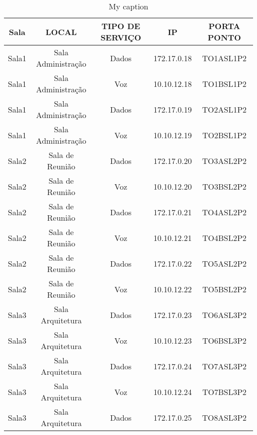 \begin{table}[]
	\centering
	\caption{My caption}
	\label{my-label}
	\begin{tabular}{ccccc}
		\hline
		\rowcolor[HTML]{9B9B9B} 
		Sala   & \textbf{LOCAL}     & \textbf{TIPO DE SERVIÇO} & \textbf{IP} & \textbf{PORTA PONTO} \\ \hline
		Sala1  & Sala Administração & Dados           & 172.17.0.18 	& TO1ASL1P2            \\ \hline
		Sala1  & Sala Administração & Voz             & 10.10.12.18   	& TO1BSL1P2            \\ \hline
		Sala1  & Sala Administração & Dados           & 172.17.0.19 	& TO2ASL1P2            \\ \hline
		Sala1  & Sala Administração & Voz             & 10.10.12.19  	& TO2BSL1P2            \\ \hline
		Sala2  & Sala de Reunião    & Dados           & 172.17.0.20 	& TO3ASL2P2            \\ \hline
		Sala2  & Sala de Reunião    & Voz             & 10.10.12.20     & TO3BSL2P2            \\ \hline
		Sala2  & Sala de Reunião    & Dados           & 172.17.0.21 	& TO4ASL2P2            \\ \hline
		Sala2  & Sala de Reunião    & Voz             & 10.10.12.21     & TO4BSL2P2            \\ \hline
		Sala2  & Sala de Reunião    & Dados           & 172.17.0.22 	& TO5ASL2P2            \\ \hline
		Sala2  & Sala de Reunião    & Voz             & 10.10.12.22     & TO5BSL2P2            \\ \hline
		Sala3  & Sala Arquitetura   & Dados           & 172.17.0.23 	& TO6ASL3P2            \\ \hline
		Sala3  & Sala Arquitetura   & Voz             & 10.10.12.23     & TO6BSL3P2            \\ \hline
		Sala3  & Sala Arquitetura   & Dados           & 172.17.0.24 	& TO7ASL3P2            \\ \hline
		Sala3  & Sala Arquitetura   & Voz             & 10.10.12.24     & TO7BSL3P2            \\ \hline
		Sala3  & Sala Arquitetura   & Dados           & 172.17.0.25 	& TO8ASL3P2            \\ \hline

\end{tabular}
\end{table}
